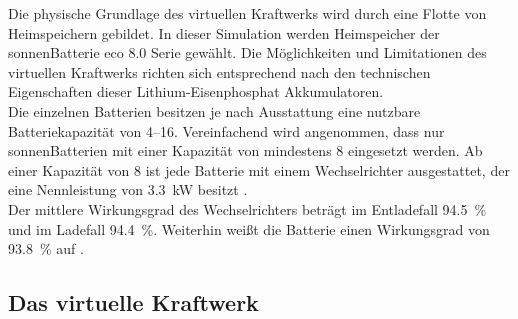Die physische Grundlage des virtuellen Kraftwerks wird durch eine Flotte von Heimspeichern gebildet. In dieser Simulation werden Heimspeicher der sonnenBatterie eco 8.0 Serie gewählt. Die Möglichkeiten und Limitationen des virtuellen Kraftwerks richten sich entsprechend nach den technischen Eigenschaften dieser Lithium-Eisenphosphat Akkumulatoren.\\
Die einzelnen Batterien besitzen je nach Ausstattung eine nutzbare Batteriekapazität von \SIrange{4}{16}{\kwh}. Vereinfachend wird angenommen, dass nur sonnenBatterien mit einer Kapazität von mindestens \SI{8}{\kwh} eingesetzt werden. Ab einer Kapazität von  \SI{8}{\kwh} ist jede Batterie  mit einem Wechselrichter ausgestattet, der eine Nennleistung von \SI{3.3}{\kilo\watt} besitzt \parencite{sonnenBat18}.\\
Der mittlere Wirkungsgrad des Wechselrichters beträgt im Entladefall \SI{94.5}{\percent} und im Ladefall \SI{94.4}{\percent}. Weiterhin weißt die Batterie einen Wirkungsgrad von \SI{93.8}{\percent} auf \parencite{htwInspek19}.

\subsection{Das virtuelle Kraftwerk}\label{sec:VK_Theorie}

